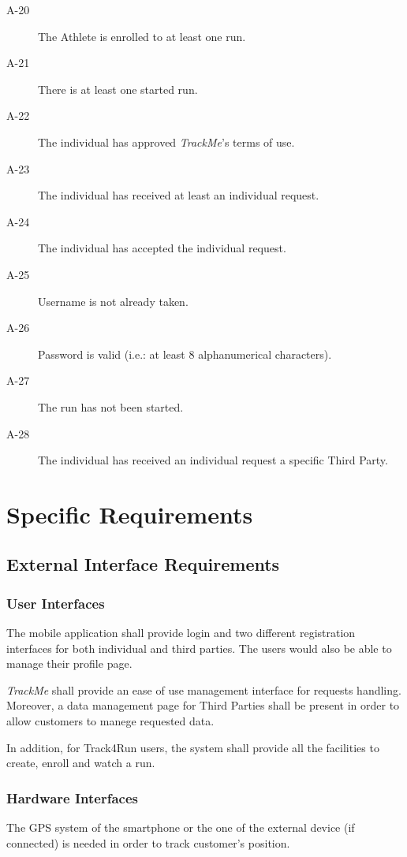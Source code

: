 \documentclass[a4paper]{article}
\begin{document}
\begin{description}
        \item[A-20] The Athlete is enrolled to at least one run.
        \item[A-21] There is at least one started run.
        \item[A-22] The individual has approved \textit{TrackMe}'s terms of use.
        \item[A-23] The individual has received at least an individual request.
        \item[A-24] The individual has accepted the individual request.
        \item[A-25] Username is not already taken.
        \item[A-26] Password is valid (i.e.: at least 8 alphanumerical characters).
        \item[A-27] The run has not been started.
        \item[A-28] The individual has received an individual request a specific Third Party.
        \end{description}
        
\newpage
\section{Specific Requirements}

    \subsection{External Interface Requirements}
        
        \subsubsection{User Interfaces}
        
        The mobile application shall provide login and two different registration interfaces for both individual and third parties. The users would also be able to manage their profile page.
        
        \textit{TrackMe} shall provide an ease of use management interface for requests handling. Moreover, a data management page for Third Parties shall be present in order to allow customers to manege requested data.
        
        In addition, for Track4Run users, the system shall provide all the facilities to create, enroll and watch a run.
        
        \subsubsection{Hardware Interfaces}
        The GPS system of the smartphone or the one of the external device (if connected) is needed in order to track customer's position.
        
\end{document}
